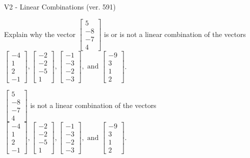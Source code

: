 \begin{exercise}
  \begin{exerciseTitle}V2 - Linear Combinations (ver. 591)\end{exerciseTitle}
  \begin{exerciseStatement}
    Explain why the vector \(\left[\begin{array}{c}
5 \\
-8 \\
-7 \\
4
\end{array}\right]\)  is or is not a linear 
	combination of the vectors \(\left[\begin{array}{c}
-4 \\
1 \\
2 \\
-1
\end{array}\right] , \left[\begin{array}{c}
-2 \\
-2 \\
-5 \\
1
\end{array}\right] , \left[\begin{array}{c}
-1 \\
-3 \\
-2 \\
-3
\end{array}\right] , \text{ and } \left[\begin{array}{c}
-9 \\
3 \\
1 \\
2
\end{array}\right]\).
	


  \end{exerciseStatement}
  \begin{exerciseAnswer}
   \(\left[\begin{array}{c}
5 \\
-8 \\
-7 \\
4
\end{array}\right]\) 
  	 is not  
	a linear combination of the vectors \(\left[\begin{array}{c}
-4 \\
1 \\
2 \\
-1
\end{array}\right] , \left[\begin{array}{c}
-2 \\
-2 \\
-5 \\
1
\end{array}\right] , \left[\begin{array}{c}
-1 \\
-3 \\
-2 \\
-3
\end{array}\right] , \text{ and } \left[\begin{array}{c}
-9 \\
3 \\
1 \\
2
\end{array}\right]\).


\end{exerciseAnswer}
\end{exercise}
